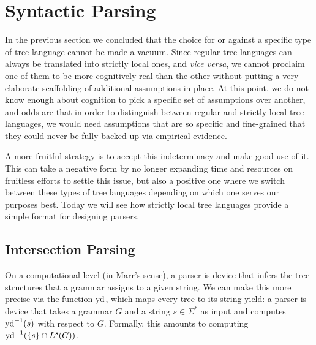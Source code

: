 \chapter{Syntactic Parsing}
\label{cha:Parsing}

In the previous section we concluded that the choice for or against a specific type of tree language cannot be made a vacuum.
Since regular tree languages can always be translated into strictly local ones, and \emph{vice versa}, we cannot proclaim one of them to be more cognitively real than the other without putting a very elaborate scaffolding of additional assumptions in place.
At this point, we do not know enough about cognition to pick a specific set of assumptions over another, and odds are that in order to distinguish between regular and strictly local tree languages, we would need assumptions that are so specific and fine-grained that they could never be fully backed up via empirical evidence.

A more fruitful strategy is to accept this indeterminacy and make good use of it.
This can take a negative form by no longer expanding time and resources on fruitless efforts to settle this issue, but also a positive one where we switch between these types of tree languages depending on which one serves our purposes best.
Today we will see how strictly local tree languages provide a simple format for designing parsers.


\section{Intersection Parsing}

On a computational level (in Marr's sense), a parser is device that infers the tree structures that a grammar assigns to a given string.
We can make this more precise via the function $\mathrm{yd}$, which maps every tree to its string yield: a parser is device that takes a grammar $G$ and a string $s \in \Sigma^*$ as input and computes $\mathrm{yd}^{-1}(s)$ with respect to $G$.
Formally, this amounts to computing $\mathrm{yd}^{-1}(\left \{ s \right \} \cap L^s(G))$.

